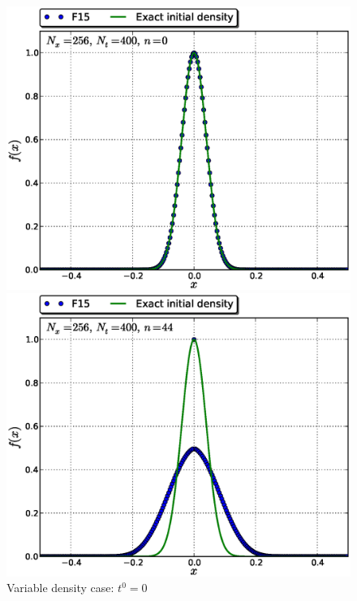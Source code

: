 \documentclass[11pt,titlepage]{report}
\begin{document}
\begin{figure}[h!] 
\label{fig:var_vel}
\captionsetup{width=0.48\linewidth}
\begin{minipage}[b]{0.5\linewidth}
\centering
\includegraphics[width=\linewidth]{graphics/f_N_v_S_F15_Nx256Nt400_w_f0_it00000}
\caption{Variable density case: $t^0 = 0$}
\vspace{4ex}
\end{minipage}%
\begin{minipage}[b]{0.5\linewidth}
\centering
\includegraphics[width=\linewidth]{graphics/f_N_v_S_F15_Nx256Nt400_w_f0_it00044}

\end{minipage}
\end{figure}
\end{document}
